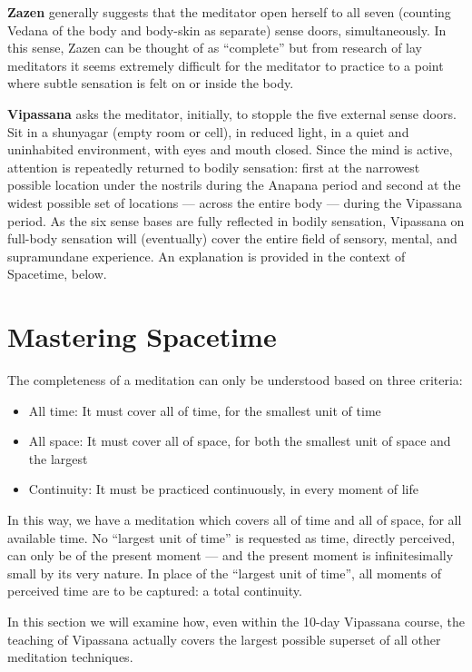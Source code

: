 \documentclass[a4paper, amsfonts, amssymb, amsmath, reprint, showkeys, nofootinbib, twoside]{revtex4-1}
\begin{document}
\textbf{Zazen} generally suggests that the meditator open herself to all seven
(counting Vedana of the body and body-skin as separate) sense doors,
simultaneously. In this sense, Zazen can be thought of as ``complete'' but from
research of lay meditators it seems extremely difficult for the meditator to practice
to a point where subtle sensation is felt on or inside the body.

\textbf{Vipassana} asks the meditator, initially, to stopple the five external sense
doors. Sit in a shunyagar (empty room or cell), in reduced light, in a quiet and uninhabited
environment, with eyes and mouth closed. Since the mind is active, attention is
repeatedly returned to bodily sensation: first at the narrowest possible location
under the nostrils during the Anapana period and second at the widest possible set of
locations --- across the entire body --- during the Vipassana period. As the six
sense bases are fully reflected in bodily sensation, Vipassana on full-body sensation
will (eventually) cover the entire field of sensory, mental, and supramundane
experience. An explanation is provided in the context of Spacetime, below.

\section{Mastering Spacetime}

The completeness of a meditation can only be understood based on three criteria:

\begin{itemize}
  \item All time: It must cover all of time, for the smallest unit of time
  \item All space: It must cover all of space, for both the smallest unit of space and the largest
  \item Continuity: It must be practiced continuously, in every moment of life
\end{itemize}

In this way, we have a meditation which covers all of time and all of space, for all
available time. No ``largest unit of time'' is requested as time, directly perceived,
can only be of the present moment --- and the present moment is infinitesimally small
by its very nature. In place of the ``largest unit of time'', all moments of
perceived time are to be captured: a total continuity.

In this section we will examine how, even within the 10-day Vipassana course, the
teaching of Vipassana actually covers the largest possible superset of all other
meditation techniques.
\end{document}
